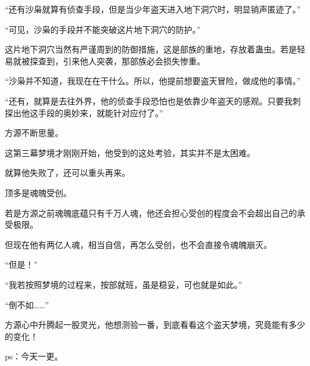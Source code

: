 \begin{this_body}
“还有沙枭就算有侦查手段，但是当少年盗天进入地下洞穴时，明显销声匿迹了。”

“可见，沙枭的手段并不能突破这片地下洞穴的防护。”

这片地下洞穴当然有严谨周到的防御措施，这是部族的重地，存放着蛊虫。若是轻易就被探查到，引来他人突袭，那部族必会损失惨重。

“沙枭并不知道，我现在在干什么。所以，他提前想要盗天冒险，做成他的事情。”

“还有，就算是去往外界，他的侦查手段恐怕也是依靠少年盗天的感观。只要我刺探出他这手段的奥妙来，就能针对应付了。”

方源不断思量。

这第三幕梦境才刚刚开始，他受到的这处考验，其实并不是太困难。

就算他失败了，还可以重头再来。

顶多是魂魄受创。

若是方源之前魂魄底蕴只有千万人魂，他还会担心受创的程度会不会超出自己的承受极限。

但现在他有两亿人魂，相当自信，再怎么受创，也不会直接令魂魄崩灭。

“但是！”

“我若按照梦境的过程来，按部就班，虽是稳妥，可也就是如此。”

“倒不如……”

方源心中升腾起一股灵光，他想测验一番，到底看看这个盗天梦境，究竟能有多少的变化！

ps：今天一更。

\end{this_body}

